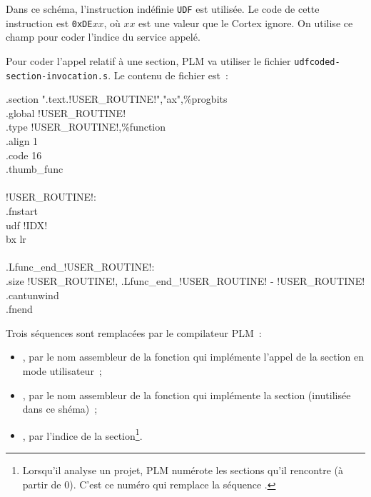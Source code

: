 Dans ce schéma, l'instruction indéfinie \texttt{UDF} est utilisée. Le code de cette instruction est \texttt{0xDE$xx$}, où $xx$ est une valeur que le Cortex ignore. On utilise ce champ pour coder l'indice du service appelé.

Pour coder l'appel relatif à une section, PLM va utiliser le fichier \texttt{udfcoded-section-invocation.s}. Le contenu de fichier est~:
\begin{SHELL}\small
\hspace*{1.2em}.section  ".text.!USER\_ROUTINE!","ax",\%progbits\\
\hspace*{1.2em}.global !USER\_ROUTINE!\\
\hspace*{1.2em}.type  !USER\_ROUTINE!,\%function\\
\hspace*{1.2em}.align  1\\
\hspace*{1.2em}.code  16\\
\hspace*{1.2em}.thumb\_func\\
\\
!USER\_ROUTINE!:\\
\hspace*{1.2em}.fnstart\\
\hspace*{1.2em}udf !IDX!\\
\hspace*{1.2em}bx  lr\\
\\
.Lfunc\_end\_!USER\_ROUTINE!:\\
\hspace*{1.2em}.size  !USER\_ROUTINE!, .Lfunc\_end\_!USER\_ROUTINE! - !USER\_ROUTINE!\\
\hspace*{1.2em}.cantunwind\\
\hspace*{1.2em}.fnend
\end{SHELL}

Trois séquences sont remplacées par le compilateur PLM~:
\begin{itemize}
\item {}, par le nom assembleur de la fonction qui implémente l'appel de la section en mode utilisateur~;
\item {}, par le nom assembleur de la fonction qui implémente la section (inutilisée dans ce shéma)~;
\item {}, par l'indice de la section\footnote{Lorsqu'il analyse un projet, PLM numérote les sections qu'il rencontre (à partir de $0$). C'est ce numéro qui remplace la séquence .}.
\end{itemize}

